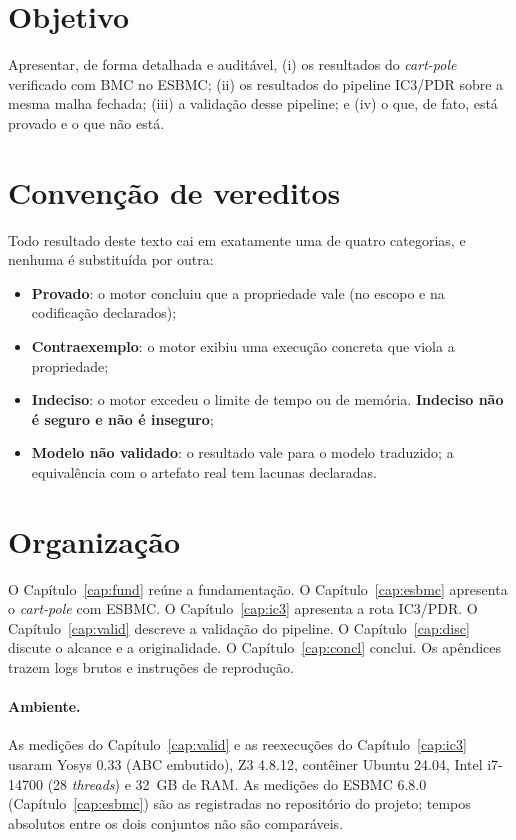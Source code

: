 \documentclass[12pt,openright,oneside,a4paper,chapter=TITLE,sumario=tradicional,english,brazil]{abntex2}
\newcommand{\vtag}[1]{\textbf{#1}}
\begin{document}
\section{Objetivo}

Apresentar, de forma detalhada e auditável, (i) os resultados do \emph{cart-pole} verificado com BMC no ESBMC; (ii) os resultados do pipeline IC3/PDR sobre a mesma malha fechada; (iii) a validação desse pipeline; e (iv) o que, de fato, está provado e o que não está.

\section{Convenção de vereditos}

Todo resultado deste texto cai em exatamente uma de quatro categorias, e nenhuma é substituída por outra:

\begin{itemize}
  \item \vtag{Provado}: o motor concluiu que a propriedade vale (no escopo e na codificação declarados);
  \item \vtag{Contraexemplo}: o motor exibiu uma execução concreta que viola a propriedade;
  \item \vtag{Indeciso}: o motor excedeu o limite de tempo ou de memória. \textbf{Indeciso não é seguro e não é inseguro};
  \item \vtag{Modelo não validado}: o resultado vale para o modelo traduzido; a equivalência com o artefato real tem lacunas declaradas.
\end{itemize}

\section{Organização}

O Capítulo~\ref{cap:fund} reúne a fundamentação. O Capítulo~\ref{cap:esbmc} apresenta o \emph{cart-pole} com ESBMC. O Capítulo~\ref{cap:ic3} apresenta a rota IC3/PDR. O Capítulo~\ref{cap:valid} descreve a validação do pipeline. O Capítulo~\ref{cap:disc} discute o alcance e a originalidade. O Capítulo~\ref{cap:concl} conclui. Os apêndices trazem logs brutos e instruções de reprodução.

\paragraph{Ambiente.} As medições do Capítulo~\ref{cap:valid} e as reexecuções do Capítulo~\ref{cap:ic3} usaram Yosys 0.33 (ABC embutido), Z3 4.8.12, contêiner Ubuntu 24.04, Intel i7-14700 (28 \emph{threads}) e 32~GB de RAM. As medições do ESBMC 6.8.0 (Capítulo~\ref{cap:esbmc}) são as registradas no repositório do projeto; tempos absolutos entre os dois conjuntos não são comparáveis.
\end{document}

